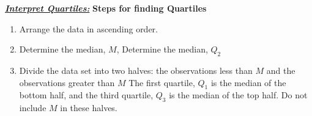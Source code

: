 \documentclass{report}
\begin{document}
         \bigbreak \noindent \bigbreak \noindent 
         \textbf{\textit{\underline{Interpret Quartiles:}}}
         \bigbreak \noindent 
         \textbf{Steps for finding Quartiles}
         \begin{enumerate}
             \item Arrange the data in ascending order.
             \item Determine the median, $M $, Determine the median, $Q_{2}$
             \item Divide the data set into two halves: the observations less than $M$  and the observations greater than $M$  The first quartile, $Q_{1}$  is the median of the bottom half, and the third quartile, $Q_{3}$  is the median of the top half. Do not include $M$ in these halves.
         \end{enumerate}
\end{document}

